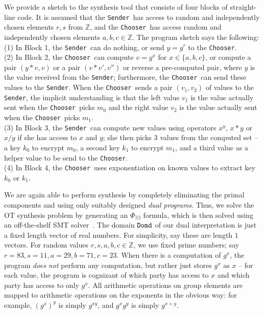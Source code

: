 \documentclass[preprint]{sig-alternate-05-2015}
\def\sender{{\tt{Sender}}}
\def\chooser{{\tt{Chooser}}}
\def\domd{{\tt{Domd}}}
\begin{document}
We provide a sketch to the synthesis tool that consists of four blocks of straight-line code.
It is assumed that the \sender\ has access to random and independently chosen elements 
$r,s$ from $\mathbb{Z}$, and the \chooser\ has access random and independently chosen
elements $a,b,c\in\mathbb{Z}$.  The program sketch says the following:
\\
(1) In Block 1, the \sender\ can do nothing, or send $y=g^r$ to the \chooser.
\\
(2) In Block 2, the \chooser\ can compute $v=g^x$ for $x\in\{a,b,c\}$, or compute
a pair $(y*v,v)$ or a pair $(v*v',v'')$ or reverse a pre-computed pair, 
where $y$ is the value received from the \sender; furthermore,
the \chooser\ can send these values to the \sender.
When the \chooser\ sends a pair $(v_1,v_2)$ of values to the \sender, 
the implicit understanding is that
the left value $v_1$ is the value actually sent when the \chooser\ picks $m_0$ and 
the right value $v_2$ is the value actually sent when the \chooser\ picks $m_1$.
\\
(3) In Block 3, the \sender\ can compute new values using operators
$x^y$, $x*y$ or $x/y$ if she has access to $x$ and $y$;
she then picks 3 values from the 
computed set -- a key $k_0$ to
encrypt $m_0$, a second key $k_1$ to encrypt $m_1$, and a third value as a helper value
to be send to the \chooser.
\\
(4) In Block 4, the \chooser\ uses exponentiation on known values to extract key $k_0$ or $k_1$.

We are again able to perform synthesis by completely eliminating the primal components
and using only suitably designed %
{\em{dual programs}}.
Thus, we solve the OT synthesis problem by generating 
an $\Phi_{\exists\exists}$ formula, which is then solved using an
off-the-shelf SMT solver~\cite{yices,z3}.
%
The domain $\domd$ of our dual interpretation is just a fixed length
vector of real numbers. For simplicity, say these are length $1$ vectors.
For random values $r,s,a,b,c\in\mathbb{Z}$, we use fixed prime numbers;
say $r=83,s=11,a=29,b=71,c=23$. 
When there is a computation of $g^x$, the program {\em{does not}} perform any computation,
but rather just stores $g^x$ as $x$ -- for each value, the program is cognizant of
which party has access to $x$ and which party has access to only $g^x$.
All arithmetic operations on group elements are mapped to arithmetic operations
on the exponents in the obvious way: for example, $(g^x)^y$ is simply $g^{xy}$,
and $g^xg^y$ is simply $g^{x+y}$. 
\end{document}
